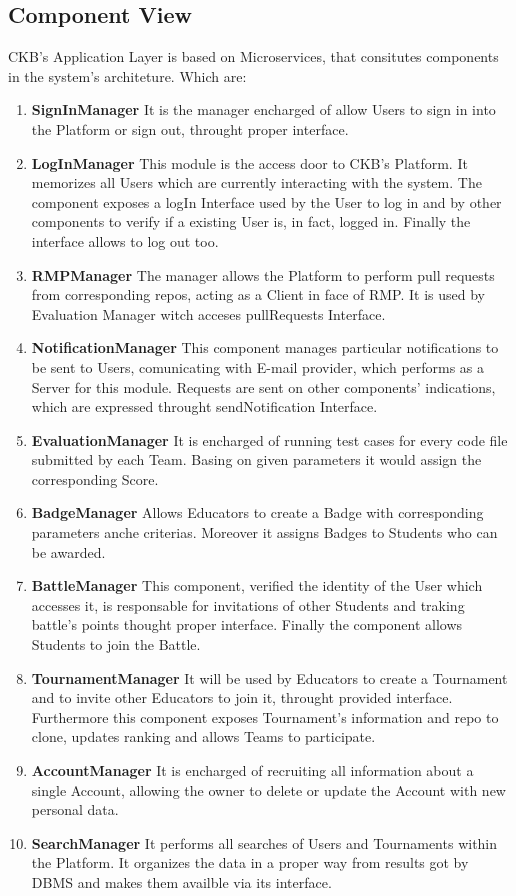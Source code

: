 \subsection{Component View}
CKB's Application Layer is based on Microservices, that consitutes components in the system's architeture.
Which are:
\begin{enumerate}
    \item \textbf{SignInManager} It is the manager encharged of allow Users to sign in into the Platform or sign out, throught proper interface.
    \item \textbf{LogInManager} This module is the access door to CKB's Platform. It memorizes all Users which are currently interacting with the system. The component exposes a logIn Interface used by the User to log in and by other components to verify if a existing User is, in fact, logged in. Finally the interface allows to log out too.
    \item \textbf{RMPManager} The manager allows the Platform to perform pull requests from corresponding repos, acting as a Client in face of RMP. It is used by Evaluation Manager witch acceses pullRequests Interface.
    \item \textbf{NotificationManager} This component manages particular notifications to be sent to Users, comunicating with E-mail provider, which performs as a Server for this module. Requests are sent on other components' indications, which are expressed throught sendNotification Interface.
    \item \textbf{EvaluationManager} It is encharged of running test cases for every code file submitted by each Team. Basing on given parameters it would assign the corresponding Score.
    \item \textbf{BadgeManager} Allows Educators to create a Badge with corresponding parameters anche criterias. Moreover it assigns Badges to Students who can be awarded.
    \item \textbf{BattleManager} This component, verified the identity of the User which accesses it, is responsable for invitations of other Students and traking battle's points thought proper interface. Finally the component allows Students to join the Battle.
    \item \textbf{TournamentManager} It will be used by Educators to create a Tournament and to invite other Educators to join it, throught provided interface. Furthermore this component exposes Tournament's information and repo to clone, updates ranking and allows Teams to participate.
    \item \textbf{AccountManager} It is encharged of recruiting all information about a single Account, allowing the owner to delete or update the Account with new personal data.
    \item \textbf{SearchManager} It performs all searches of Users and Tournaments within the Platform. It organizes the data in a proper way from results got by DBMS and makes them availble via its interface.
\end{enumerate}
